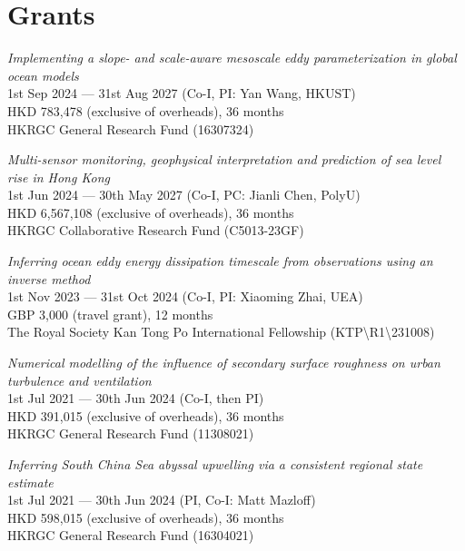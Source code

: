 \documentclass[letterpaper]{article}
\renewenvironment{itemize}{
  \begin{list}{}{
    \setlength{\leftmargin}{1.5em}
  }
}{
  \end{list}
}
\begin{document}
\section*{Grants}

\begin{itemize}

\item[--] \textit{Implementing a slope- and scale-aware mesoscale eddy parameterization in
global ocean models}\\
1st Sep 2024 --- 31st Aug 2027 (Co-I, PI: Yan Wang, HKUST)\\
HKD 783,478 (exclusive of overheads), 36 months\\
HKRGC General Research Fund (16307324)

\item[--] \textit{Multi-sensor monitoring, geophysical interpretation and prediction of sea level rise in Hong Kong}\\
1st Jun 2024 --- 30th May 2027 (Co-I, PC: Jianli Chen, PolyU)\\
HKD 6,567,108 (exclusive of overheads), 36 months\\
HKRGC Collaborative Research Fund (C5013-23GF)

\item[--] \textit{Inferring ocean eddy energy dissipation timescale from observations using an inverse method}\\
1st Nov 2023 --- 31st Oct 2024 (Co-I, PI: Xiaoming Zhai, UEA)\\
GBP 3,000 (travel grant), 12 months\\
The Royal Society Kan Tong Po International Fellowship (KTP\textbackslash R1\textbackslash 231008)

\item[--] \textit{Numerical modelling of the influence of secondary surface roughness on urban turbulence and ventilation}\\
1st Jul 2021 --- 30th Jun 2024 (Co-I, then PI)\\
HKD 391,015 (exclusive of overheads), 36 months\\
HKRGC General Research Fund (11308021)

\item[--] \textit{Inferring South China Sea abyssal upwelling via a consistent regional state estimate}\\
1st Jul 2021 --- 30th Jun 2024 (PI, Co-I: Matt Mazloff)\\
HKD 598,015 (exclusive of overheads), 36 months\\
HKRGC General Research Fund (16304021)


\end{itemize}
\end{document}
